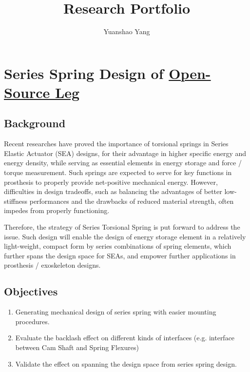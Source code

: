 \documentclass[12pt]{article}
\title{Research Portfolio}
\author{Yuanshao Yang}
\date{}
\begin{document}
\maketitle


\tableofcontents
\newpage

\section{Series Spring Design of \href{https://www.opensourceleg.org/}{Open-Source Leg}}

\subsection{Background}


Recent researches have proved the importance of torsional springs in Series Elastic Actuator (SEA) designs, for their advantage in higher specific energy and energy density, while serving as essential elements in energy storage and force / torque measurement. Such springs are expected to serve for key functions in prosthesis to properly provide net-positive mechanical energy. However, difficulties in design tradeoffs, such as balancing the advantages of better low-stiffness performances and the drawbacks of reduced material strength, often impedes from properly functioning. 


Therefore, the strategy of Series Torsional Spring is put forward to address the issue. Such design will enable the design of energy storage element in a relatively light-weight, compact form by series combinations of spring elements, which further spans the design space for SEAs, and empower further applications in prosthesis / exoskeleton designs. 

\subsection{Objectives}

\begin{enumerate}

    \item {Generating mechanical design of series spring with easier mounting procedures.}
    \item {Evaluate the backlash effect on different kinds of interfaces (e.g. interface between Cam Shaft and Spring Flexures)}
    \item {Validate the effect on spanning the design space from series spring design.}

\end{enumerate}
\end{document}
